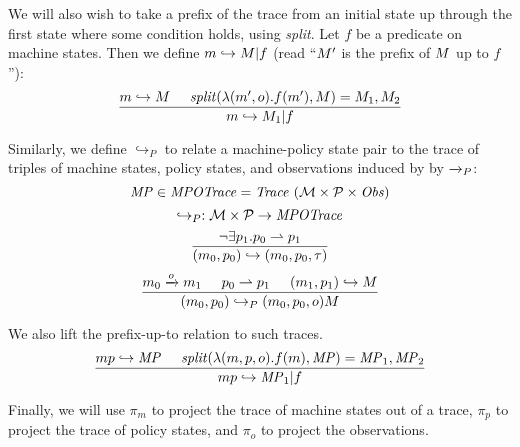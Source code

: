 \documentclass[acmsmall,review,anonymous]{acmart}\settopmatter{printfolios=true,printccs=false,printacmref=false}
\begin{document}
We will also wish to take a prefix of the trace from an initial state up through the first state where
some condition holds, using {\it split}. Let \(f\) be a predicate on machine states. Then we define
\(m \hookrightarrow M | f\) (read ``\(M'\) is the prefix of \(M\) up to \(f\)''):
  \[\frac{m \hookrightarrow M \hspace{.5cm} \mathit{split}(\lambda (m',o).f(m'),M)
            = M_1,M_2}
         {m \hookrightarrow M_1 | f}\]

Similarly, we define \(\hookrightarrow_P\) to relate a machine-policy
state pair to the trace of triples of machine states, policy states,
and observations induced by by \(\xrightarrow{}_P\):
%
  \[\MPT \in \mathit{MPOTrace} = \mathit{Trace}\ (\MACHS \times \POLS \times \OBSS)\]
  \[\hookrightarrow_P : {\mathcal M} \times \mathcal{P} \rightarrow \mathit{MPOTrace}\]
  \[\frac{\neg \exists p_1 . p_0 \rightharpoonup p_1}
         {(m_0,p_0) \hookrightarrow (m_0,p_0,\tau)}\]
  \[\frac{m_0 \xrightarrow{o} m_1 \hspace{.5cm} p_0 \rightharpoonup p_1 \hspace{.5cm}
            (m_1,p_1) \hookrightarrow M}
         {(m_0,p_0) \hookrightarrow_P (m_0,p_0,o) M}\]

We also lift the prefix-up-to relation to such traces.
  \[\frac{mp \hookrightarrow \mathit{MP} \hspace{.5cm}
            \mathit{split}(\lambda (m,p,o).f(m),\mathit{MP}) = \mathit{MP}_1,\mathit{MP}_2}
         {mp \hookrightarrow \mathit{MP}_1 | f}\]

Finally, we will use \(\pi_m\) to project the trace of machine states
out of a trace, \(\pi_p\) to project the trace of policy states, and
\(\pi_o\) to project the observations.
       
\end{document}
